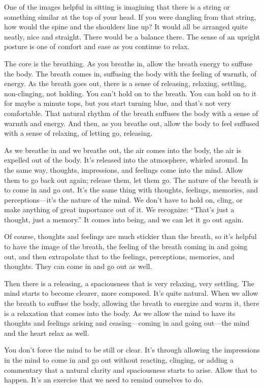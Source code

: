 One of the images helpful in sitting is imagining that there is a string
or something similar at the top of your head. If you were dangling from
that string, how would the spine and the shoulders line up? It would all
be arranged quite neatly, nice and straight. There would be a balance
there. The sense of an upright posture is one of comfort and ease as you
continue to relax.

The core is the breathing. As you breathe in, allow the breath energy to
suffuse the body. The breath comes in, suffusing the body with the
feeling of warmth, of energy. As the breath goes out, there is a sense
of releasing, relaxing, settling, non-clinging, not holding. You can’t
hold on to the breath. You can hold on to it for maybe a minute tops,
but you start turning blue, and that’s not very comfortable. That
natural rhythm of the breath suffuses the body with a sense of warmth
and energy. And then, as you breathe out, allow the body to feel
suffused with a sense of relaxing, of letting go, releasing.

As we breathe in and we breathe out, the air comes into the body, the
air is expelled out of the body. It’s released into the atmosphere,
whirled around. In the same way, thoughts, impressions, and feelings
come into the mind. Allow them to go back out again; release them, let
them go. The nature of the breath is to come in and go out. It’s the
same thing with thoughts, feelings, memories, and perceptions—it’s the
nature of the mind. We don’t have to hold on, cling, or make anything of
great importance out of it. We recognize: “That’s just a thought, just a
memory.” It comes into being, and we can let it go out again.

Of course, thoughts and feelings are much stickier than the breath, so
it’s helpful to have the image of the breath, the feeling of the breath
coming in and going out, and then extrapolate that to the feelings,
perceptions, memories, and thoughts. They can come in and go out as
well.

Then there is a releasing, a spaciousness that is very relaxing, very
settling. The mind starts to become clearer, more composed. It’s quite
natural. When we allow the breath to suffuse the body, allowing the
breath to energize and warm it, there is a relaxation that comes into
the body. As we allow the mind to have its thoughts and feelings arising
and ceasing—coming in and going out—the mind and the heart relax as
well.

You don’t force the mind to be still or clear. It’s through allowing the
impressions in the mind to come in and go out without reacting,
clinging, or adding a commentary that a natural clarity and spaciousness
starts to arise. Allow that to happen. It’s an exercise that we need to
remind ourselves to do.

